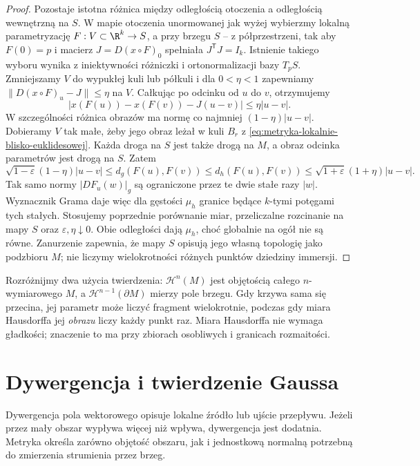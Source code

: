 \begin{proof}
Pozostaje istotna różnica między odległością otoczenia
a odległością wewnętrzną na $S$. W mapie otoczenia
unormowanej jak wyżej wybierzmy lokalną parametryzację
$F:V\subset\R^k\to S$, a przy brzegu $S$ -- z półprzestrzeni,
tak aby $F(0)=p$ i macierz $J=D(x\circ F)_0$ spełniała
$J^{\mathsf T}J=I_k$. Istnienie takiego wyboru wynika
z iniektywności różniczki i ortonormalizacji bazy $T_pS$.
Zmniejszamy $V$ do wypukłej kuli lub półkuli i dla
$0<\eta<1$ zapewniamy
$\|D(x\circ F)_u-J\|\leq\eta$ na $V$.
Całkując po odcinku od $u$ do $v$, otrzymujemy
\[
 |x(F(u))-x(F(v))-J(u-v)|\leq\eta|u-v|.
\]
W szczególności różnica obrazów ma normę co najmniej
$(1-\eta)|u-v|$. Dobieramy $V$ tak małe, żeby jego
obraz leżał w kuli $B_r$ z
\eqref{eq:metryka-lokalnie-blisko-euklidesowej}.
Każda droga na $S$ jest także drogą na $M$, a obraz
odcinka parametrów jest drogą na $S$. Zatem
\[
 \sqrt{1-\varepsilon}(1-\eta)|u-v|
 \leq d_g(F(u),F(v))
 \leq d_h(F(u),F(v))
 \leq\sqrt{1+\varepsilon}(1+\eta)|u-v|.
\]
Tak samo normy $|D F_u(w)|_g$ są ograniczone przez
te dwie stałe razy $|w|$. Wyznacznik Grama daje więc
dla gęstości $\mu_h$ granice będące $k$-tymi potęgami
tych stałych. Stosujemy poprzednie porównanie miar,
przeliczalne rozcinanie na mapy $S$ oraz
$\varepsilon,\eta\downarrow0$. Obie odległości dają
$\mu_h$, choć globalnie na ogół nie są równe.
Zanurzenie zapewnia, że mapy $S$ opisują jego własną
topologię jako podzbioru $M$; nie liczymy wielokrotności
różnych punktów dziedziny immersji.
\end{proof}

Rozróżnijmy dwa użycia twierdzenia:
$\mathcal H^n(M)$ jest objętością całego
$n$-wymiarowego $M$, a
$\mathcal H^{n-1}(\partial M)$ mierzy
pole brzegu. Gdy krzywa sama się przecina,
jej parametr może liczyć fragment
wielokrotnie, podczas gdy miara Hausdorffa
jej \emph{obrazu} liczy każdy punkt raz.
Miara Hausdorffa nie wymaga gładkości;
znaczenie to ma przy zbiorach osobliwych
i granicach rozmaitości.

\section{Dywergencja i twierdzenie Gaussa}
\label{sec:metryka-gauss}

Dywergencja pola wektorowego opisuje lokalne
źródło lub ujście przepływu. Jeżeli przez mały
obszar wypływa więcej niż wpływa, dywergencja
jest dodatnia. Metryka określa zarówno objętość
obszaru, jak i jednostkową normalną potrzebną
do zmierzenia strumienia przez brzeg.

